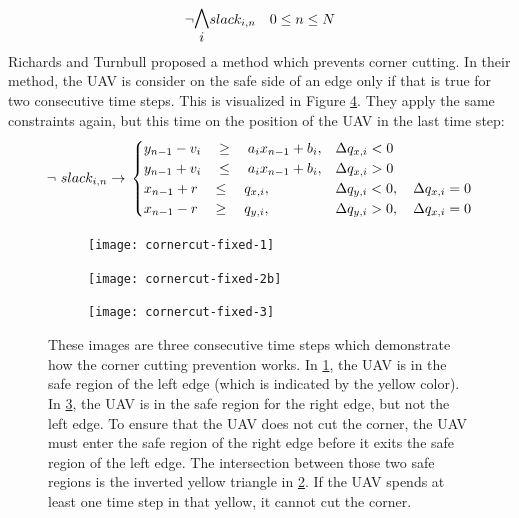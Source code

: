 \begin{equation}
\label{eq:obs-comb-repeat-1}
\neg \mathlarger{\mathlarger{\bigwedge_{i}}} slack_{i,n} \quad 0 \leq n \leq N
\end{equation}
Richards and Turnbull\cite{Richards2015} proposed a method which prevents corner cutting. In their method, the UAV is consider on the safe side of an edge only if that is true for two consecutive time steps.  This is visualized in Figure \ref{fig:cc-fixed}. They apply the same constraints again, but this time on the position of the UAV in the last time step:
\begin{equation}
\label{eq:corner-skip-fixed}
\neg ~ slack_{i,n} \rightarrow \\
\begin{cases}
y_{n-1} -  v_i \quad \geq 
\quad a_{i} x_{n-1} + b_{i},  	
& \Delta q_{x,i} < 0 							 	
 \\
y_{n-1} + v_i \quad \leq 
\quad a_{i} x_{n-1} + b_{i},
& \Delta q_{x,i} > 0 							 	
 \\
x_{n-1} + r \quad \leq
\quad  q_{x,i}, 		
& \Delta q_{y,i} < 0, \quad \Delta q_{x,i} = 0 	
 \\
x_{n-1} - r \quad \geq 
\quad q_{y,i},  		
& \Delta q_{y,i} > 0, \quad \Delta q_{x,i} = 0 	
\end{cases}
\end{equation}
\begin{figure}
	\centering
	\begin{subfigure}[t]{0.3\columnwidth}
        		\texttt{[image: cornercut-fixed-1]}
        		\caption{}
        		\label{fig:cc-fixed-1}
	\end{subfigure}
	\hfil
	\begin{subfigure}[t]{0.3\columnwidth}
        		\texttt{[image: cornercut-fixed-2b]}
        		\caption{}
        		 \label{fig:cc-fixed-2}
	\end{subfigure}	
		\hfil
	\begin{subfigure}[t]{0.3\columnwidth}
        		\texttt{[image: cornercut-fixed-3]}
        		\caption{}
        		\label{fig:cc-fixed-3}
	\end{subfigure}
    \caption{These images are three consecutive time steps which demonstrate how the corner cutting prevention works. In \ref{fig:cc-fixed-1}, the UAV is in the safe region of the left edge (which is indicated by the yellow color). In \ref{fig:cc-fixed-3}, the UAV is in the safe region for the right edge, but not the left edge. To ensure that the UAV does not cut the corner, the UAV must enter the safe region of the right edge before it exits the safe region of the left edge. The intersection between those two safe regions is the inverted yellow triangle in \ref{fig:cc-fixed-2}. If the UAV spends at least one time step in that yellow, it cannot cut the corner.}
    \label{fig:cc-fixed}     
\end{figure}

